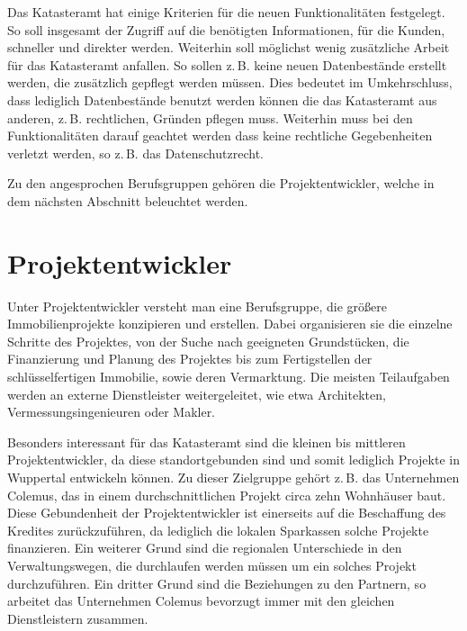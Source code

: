 Das Katasteramt hat einige Kriterien für die neuen Funktionalitäten festgelegt. 
So soll insgesamt der Zugriff auf die benötigten Informationen, für die Kunden, schneller und direkter werden.
Weiterhin soll möglichst wenig zusätzliche Arbeit für das Katasteramt anfallen.
So sollen z.\,B. keine neuen Datenbestände erstellt werden, die zusätzlich gepflegt werden müssen.
Dies bedeutet im Umkehrschluss, dass lediglich Datenbestände benutzt werden können die das Katasteramt aus anderen, z.\,B. rechtlichen, Gründen pflegen muss.
Weiterhin muss bei den Funktionalitäten darauf geachtet werden dass keine rechtliche Gegebenheiten verletzt werden, so z.\,B. das Datenschutzrecht.

Zu den angesprochen Berufsgruppen gehören die Projektentwickler, welche in dem nächsten Abschnitt beleuchtet werden.



\section{Projektentwickler}

Unter Projektentwickler versteht man eine Berufsgruppe, die größere Immobilienprojekte konzipieren und erstellen.
Dabei organisieren sie die einzelne Schritte des Projektes, von der Suche nach geeigneten Grundstücken, die Finanzierung und Planung des Projektes bis zum Fertigstellen der schlüsselfertigen Immobilie, sowie deren Vermarktung.
Die meisten Teilaufgaben werden an externe Dienstleister weitergeleitet, wie etwa Architekten, Vermessungsingenieuren oder Makler.

Besonders interessant für das Katasteramt sind die kleinen bis mittleren Projektentwickler, da diese standortgebunden sind und somit lediglich Projekte in Wuppertal entwickeln können.
Zu dieser Zielgruppe gehört z.\,B. das Unternehmen Colemus, das in einem durchschnittlichen Projekt circa zehn Wohnhäuser baut.
Diese Gebundenheit der Projektentwickler ist einerseits auf die Beschaffung des Kredites zurückzuführen, da lediglich die lokalen Sparkassen solche Projekte finanzieren.
Ein weiterer Grund sind die regionalen Unterschiede in den Verwaltungswegen, die durchlaufen werden müssen um ein solches Projekt durchzuführen.
Ein dritter Grund sind die Beziehungen zu den Partnern, so arbeitet das Unternehmen Colemus bevorzugt immer mit den gleichen Dienstleistern zusammen.

